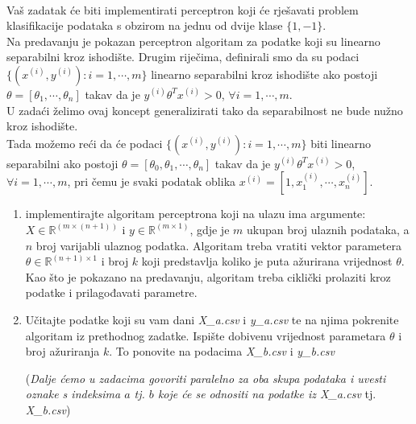 \documentclass{../../OM_style}
\begin{document}
\begin{zadatak} \hfill \\
Vaš zadatak će biti implementirati perceptron koji će rješavati problem klasifikacije podataka s obzirom na jednu od dvije klase $\{ 1, -1\}$. \\
Na predavanju je pokazan perceptron algoritam za podatke koji su linearno separabilni kroz ishodište. Drugim riječima, definirali smo da su podaci $\{ (x^{(i)}, y^{(i)}) : i=1,\cdots,m\}$ linearno separabilni kroz ishodište ako postoji $\theta = [\theta_1, \cdots, \theta_n]$ takav da je $y^{(i)} \theta ^T x^{(i)} > 0$, $\forall i = 1,\cdots, m$. \\ U zadaći želimo ovaj koncept generalizirati tako da separabilnost ne bude nužno kroz ishodište.\\
 Tada možemo reći da će podaci  $\{ (x^{(i)}, y^{(i)}) : i=1,\cdots,m\}$ biti linearno separabilni ako postoji $\theta = [\theta_0, \theta_1, \cdots, \theta_n]$ takav da je $y^{(i)} \theta ^T x^{(i)} > 0$, $\forall i = 1,\cdots, m$, pri čemu je svaki podatak oblika $x^{(i)} = [1, x_1^{(i)}, \cdots, x_n^{(i)}]$.
 
\begin{enumerate}[label=\alph*)]
\item implementirajte algoritam perceptrona koji na ulazu ima  argumente: \\ $X \in \mathbb{R}^{(m\times (n+1))} $ i $y \in \mathbb{R}^{(m\times 1)} $, gdje je $m$ ukupan broj ulaznih podataka, a $n$ broj varijabli ulaznog podatka. Algoritam treba vratiti vektor parametera $\theta \in \mathbb{R}^{(n+1)\times 1}$ i broj $k$ koji predstavlja koliko je puta ažurirana vrijednost $\theta$. \\
Kao što je pokazano na predavanju, algoritam treba ciklički prolaziti kroz podatke i prilagođavati parametre. 
\item Učitajte podatke koji su vam dani \textit{X\_a.csv} i \textit{y\_a.csv} te na njima pokrenite algoritam iz prethodnog zadatke. Ispište dobivenu vrijednost parametara $\theta$ i broj ažuriranja $k$. To ponovite na podacima \textit{X\_b.csv} i \textit{y\_b.csv}

(\textit{Dalje ćemo u zadacima govoriti paralelno za oba skupa podataka i uvesti oznake s indeksima $a$ tj. $b$ koje će se odnositi na podatke iz  \textit{X\_a.csv}} tj. \textit{X\_b.csv})


\end{enumerate}
\end{zadatak}
\end{document}
